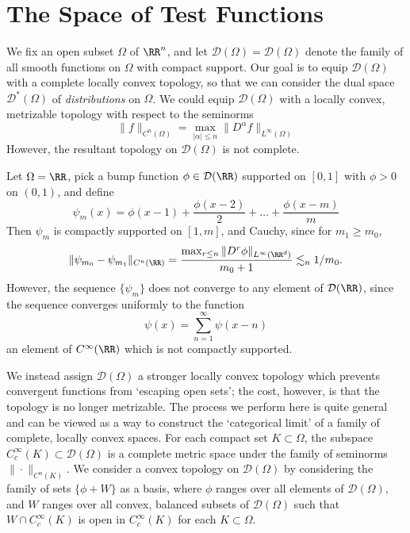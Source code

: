 \section{The Space of Test Functions}

We fix an open subset $\Omega$ of $\RR^n$, and let $\mathcal{D}(\Omega) = \mathcal{D}(\Omega)$ denote the family of all smooth functions on $\Omega$ with compact support. Our goal is to equip $\mathcal{D}(\Omega)$ with a complete locally convex topology, so that we can consider the dual space $\mathcal{D}^*(\Omega)$ of \emph{distributions} on $\Omega$. We could equip $\mathcal{D}(\Omega)$ with a locally convex, metrizable topology with respect to the seminorms
%
\[ \| f \|_{C^n(\Omega)} = \max_{|\alpha| \leq n} \| D^\alpha f \|_{L^\infty(\Omega)} \]
%
However, the resultant topology on $\mathcal{D}(\Omega)$ is not complete.

\begin{example}
    Let $\Omega = \RR$, pick a bump function $\phi \in \mathcal{D}(\RR)$ supported on $[0,1]$ with $\phi > 0$ on $(0,1)$, and define
    \[ \psi_m(x) = \phi(x-1) + \frac{\phi(x-2)}{2} + \dots + \frac{\phi(x-m)}{m} \]
    Then $\psi_m$ is compactly supported on $[1,m]$, and Cauchy, since for $m_1 \geq m_0$,
    \[ \| \psi_{m_0} - \psi_{m_1} \|_{C^n(\RR)} = \frac{ \max_{r \leq n} \| D^r \phi \|_{L^\infty(\RR^d)}}{m_0+1} \lesssim_n 1/m_0. \]
    However, the sequence $\{ \psi_m \}$ does not converge to any element of $\mathcal{D}(\RR)$, since the sequence converges uniformly to the function
    \[ \psi(x) = \sum_{n = 1}^\infty \psi(x-n) \]
    an element of $C^\infty(\RR)$ which is not compactly supported.
\end{example}

We instead assign $\mathcal{D}(\Omega)$ a stronger locally convex topology which prevents convergent functions from `escaping open sets'; the cost, however, is that the topology is no longer metrizable. The process we perform here is quite general and can be viewed as a way to construct the `categorical limit' of a family of complete, locally convex spaces. For each compact set $K \subset \Omega$, the subspace $C_c^\infty(K) \subset \mathcal{D}(\Omega)$ is a complete metric space under the family of seminorms $\| \cdot \|_{C^n(K)}$. We consider a convex topology on $\mathcal{D}(\Omega)$ by considering the family of sets $\{ \phi + W \}$ as a basis, where $\phi$ ranges over all elements of $\mathcal{D}(\Omega)$, and $W$ ranges over all convex, balanced subsets of $\mathcal{D}(\Omega)$ such that $W \cap C_c^\infty(K)$ is open in $C_c^\infty(K)$ for each $K \subset \Omega$.


